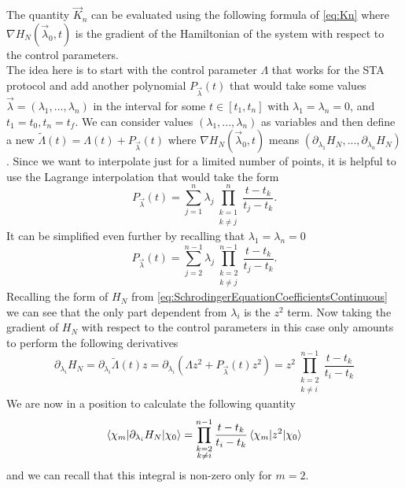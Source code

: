 The quantity $ \vec{ K }_{n} $ can be evaluated using the following formula of \cref{eq:Kn} where $ \nabla H_{N}(\vec{ \lambda }_{0}, t)$ is the gradient of the Hamiltonian of the system with respect to the control parameters.\\
The idea here is to start with the control parameter $ \Lambda $ that works for the STA protocol and add another polynomial $ P_{\vec{\lambda}}(t) $ that would take some values $ \vec{\lambda}  = (\lambda_{1},..., \lambda_{n})$ in the interval for some $ t \in [t_1, t_{n}] $ with $ \lambda_{1} = \lambda_{n} = 0 $, and $ t_{1}  = t_0 , t_{n} = t_{f} $.
We can consider values $ (\lambda_{1},..., \lambda_n) $ as variables and then define a new $ \tilde{\Lambda}(t) = \Lambda(t) +   P_{\vec{\lambda}}(t) $ where $ \nabla H_{N}(\vec{\lambda}_0,t) $ means $ (\partial_\lambda_1 H_{N},..., \partial_\lambda_{n} H_{N}) $.
Since we want to interpolate just for a limited number of points, it is helpful to use the Lagrange interpolation that would take the form
\begin{equation}
	\label{eq:LagrangeInterpolationPolynomial}
	P_{\vec{ \lambda }}(t) = \sum_{j=1}^{n}\lambda_{j}\prod_{\substack{k=1\\k\neq j }}^{n}\frac{t-t_{k}}{t_{j} - t_{k}}.
\end{equation}
It can be simplified even further by recalling that $ \lambda_{1} = \lambda_{n} = 0 $
\begin{equation}
	\label{eq:LagrangeInterpolationPolynomialSimplified}
	P_{\vec{ \lambda }}(t) = \sum_{j=2}^{n-1}\lambda_{j}\prod_{\substack{k=2\\k\neq j }}^{n-1}\frac{t-t_{k}}{t_{j} - t_{k}}.
\end{equation}
Recalling the form of $   H_{N} $ from \cref{eq:SchrodingerEquationCoefficientsContinuous} we can see that the only part dependent from $ \lambda_{i} $ is the $ z^2 $ term.
Now taking the gradient of $ H_{N} $ with respect to the control parameters in this case only amounts to perform the following derivatives
\begin{equation}
	\label{eq:GradientLambda}
	\partial_{\lambda_{i}} H_{N}=\partial_{\lambda_{i}} \tilde{ \Lambda }(t)z = \partial_{\lambda_{i}} \left(\Lambda z^2 + P_{\vec{ \lambda }}(t)z^2    \right) =z^2\prod_{\substack{k=2\\k\neq i }}^{n-1}\frac{t-t_{k}}{t_{i} - t_{k}}
\end{equation}
We are now in a position to calculate the following quantity
\begin{equation}
	\label{eq:KnOverSpace}
	\braket{\chi_{m}|\partial_{\lambda_{i}} H_{N}|\chi_{0}} = \prod_{\substack{k=2\\k\neq i }}^{n-1}\frac{t-t_{k}}{t_{i} - t_{k}} \braket{\chi_{m}|z^2 |\chi_{0}}
\end{equation}
and we can recall that this integral is non-zero only for $ m = 2 $.
